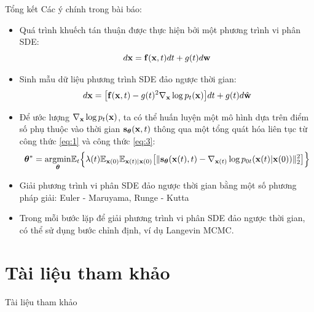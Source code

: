 \documentclass[10pt]{beamer}
\theoremstyle{remark}
\numberwithin{algocf}{section}
\numberwithin{equation}{section}
\numberwithin{dl}{section}
\numberwithin{figure}{section}
\begin{document}
\begin{frame}[shrink]{Tổng kết}
	Các ý chính trong bài báo:
	\begin{itemize}
		\item Quá trình khuếch tán thuận được thực hiện bởi một phương trình vi phân SDE:
		\begin{equation*}
			d \bold{x} = \bold{f} (\bold{x}, t) dt + g(t) d \bold{w}
		\end{equation*}
		\item Sinh mẫu dữ liệu phương trình SDE đảo ngược thời gian:
		\begin{equation*}
			d \bold{x} = \big \lbrack \bold{f}(\bold{x}, t) - g(t)^2 \nabla_{\bold{x}} \log p_t (\bold{x}) \big \rbrack dt + g(t) d \hat{\bold{w}}
		\end{equation*}
		\item Để ước lượng $\nabla_{\bold{x}} \log p_t(\bold{x})$, ta có thể huấn luyện một mô hình dựa trên điểm số phụ thuộc vào thời gian $\bold{s}_{\boldsymbol{\theta}}(\bold{x}, t)$ thông qua một tổng quát hóa liên tục từ công thức \ref{eq:1} và công thức \ref{eq:3}:
		\begin{equation*}
			\boldsymbol{\theta}^{\ast} = \underset{\boldsymbol{\theta}}{\mathrm{argmin}} \mathbb{E}_t \Big \lbrace  \lambda(t) \mathbb{E}_{\bold{x}(0)} \mathbb{E}_{\bold{x}(t) \vert \bold{x}(0)} \big \lbrack \lVert \bold{s}_{\boldsymbol{\theta}} (\bold{x}(t), t) - \nabla_{\bold{x}(t)} \log p_{0t} (\bold{x}(t) \vert \bold{x}(0)) \rVert_2^2 \big \rbrack \Big \rbrace
		\end{equation*}
		\item Giải phương trình vi phân SDE đảo ngược thời gian bằng một số phương pháp giải: Euler - Maruyama, Runge - Kutta
		\item Trong mỗi bước lặp để giải phương trình vi phân SDE đảo ngược thời gian, có thể sử dụng bước chỉnh định, ví dụ Langevin MCMC.
	\end{itemize}
\end{frame}

\section{Tài liệu tham khảo}
\begin{frame}[allowframebreaks]{Tài liệu tham khảo}
    \printbibliography
\end{frame}
\end{document}
